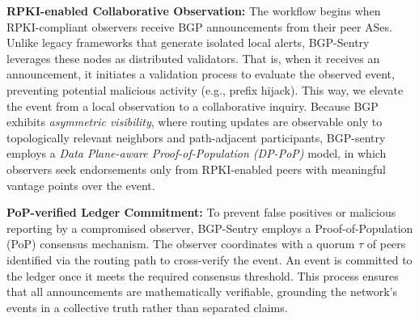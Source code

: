 \documentclass[conference]{IEEEtran}
\newcommand*\circled[1]{\tikz[baseline=(char.base)]{
            \node[shape=circle, fill=black,text=white, draw,inner sep=0.25pt] (char) {\bfseries #1};}}
\newcommand{\md}[1]{{\color{purple}#1}}
\begin{document}


\md{\noindent\circled{1} \textbf{RPKI-enabled Collaborative Observation:} The workflow begins when RPKI-compliant observers receive BGP announcements from their peer ASes. Unlike legacy frameworks that generate isolated local alerts, BGP-Sentry leverages these nodes as distributed validators. That is, when it receives an announcement, it initiates a validation process to evaluate the observed event, preventing potential malicious activity (e.g., prefix hijack). This way, we elevate the event from a local observation to a collaborative inquiry. Because BGP exhibits \emph{asymmetric visibility}, where routing updates are observable only to topologically relevant neighbors and path-adjacent participants, BGP-sentry employs a \emph{Data Plane-aware Proof-of-Population (DP-PoP)} model, in which observers seek endorsements only from RPKI-enabled peers with meaningful vantage points over the event.}

\md{\noindent\circled{2} \textbf{PoP-verified Ledger Commitment:} To prevent false positives or malicious reporting by a compromised observer, BGP-Sentry employs a Proof-of-Population (PoP) consensus mechanism. The observer coordinates with a quorum $\tau$ of peers identified via the routing path to cross-verify the event. An event is committed to the ledger once it meets the required consensus threshold. This process ensures that all announcements are mathematically verifiable, grounding the network's events in a collective truth rather than separated claims.}
\end{document}
